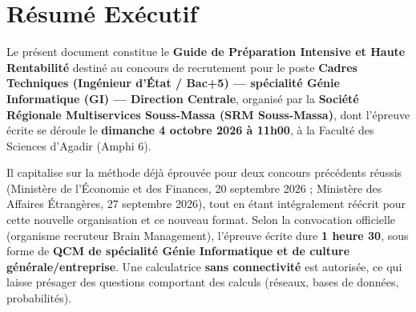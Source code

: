 \chapter*{Résumé Exécutif}

Le présent document constitue le \textbf{Guide de Préparation Intensive et Haute Rentabilité} destiné au concours de recrutement pour le poste \textbf{Cadres Techniques (Ingénieur d'État / Bac+5) --- spécialité Génie Informatique (GI) --- Direction Centrale}, organisé par la \textbf{Société Régionale Multiservices Souss-Massa (SRM Souss-Massa)}, dont l'épreuve écrite se déroule le \textbf{dimanche 4 octobre 2026 à 11h00}, à la Faculté des Sciences d'Agadir (Amphi 6).

Il capitalise sur la méthode déjà éprouvée pour deux concours précédents réussis (Ministère de l'Économie et des Finances, 20 septembre 2026 ; Ministère des Affaires Étrangères, 27 septembre 2026), tout en étant intégralement réécrit pour cette nouvelle organisation et ce nouveau format. Selon la convocation officielle (organisme recruteur Brain Management), l'épreuve écrite dure \textbf{1 heure 30}, sous forme de \textbf{QCM de spécialité Génie Informatique et de culture générale/entreprise}. Une calculatrice \textbf{sans connectivité} est autorisée, ce qui laisse présager des questions comportant des calculs (réseaux, bases de données, probabilités).

